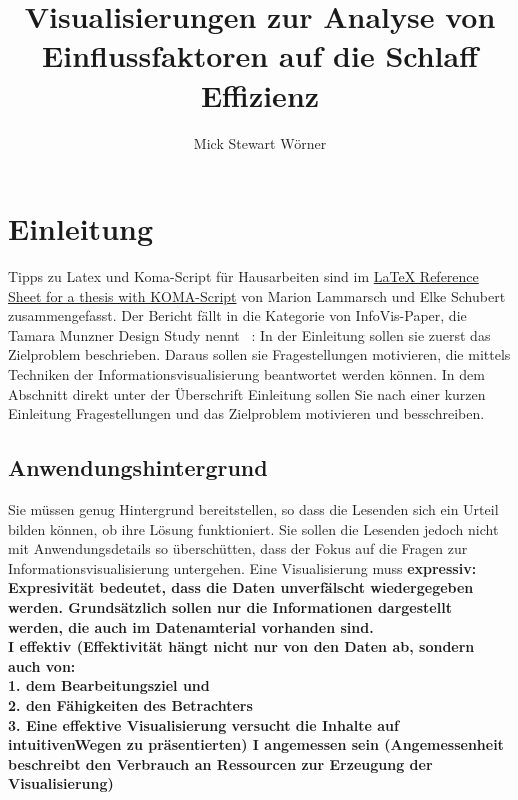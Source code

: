 \documentclass[usegeometry=true]{scrartcl}
\begin{document}
\subject{Projektbericht zum Modul Information Retrieval und Visualisierung Sommersemester 2023}
\title{Visualisierungen zur Analyse von Einflussfaktoren auf die Schlaff Effizienz}
\author{Mick Stewart Wörner}%
\maketitle%
\newpage
\section{Einleitung}
Tipps zu Latex und Koma-Script für Hausarbeiten sind im \href{http://mirrors.ctan.org/info/latex-refsheet/LaTeX_RefSheet.pdf}{LaTeX Reference Sheet for a thesis with KOMA-Script} von Marion Lammarsch und Elke Schubert zusammengefasst. 
Der Bericht fällt in die Kategorie von InfoVis-Paper, die Tamara Munzner Design Study nennt ~\cite{Munzner2008}: In der Einleitung sollen sie zuerst das Zielproblem beschrieben. Daraus sollen sie Fragestellungen motivieren, die mittels Techniken der Informationsvisualisierung beantwortet werden können. In dem Abschnitt direkt unter der Überschrift Einleitung sollen Sie nach einer kurzen Einleitung Fragestellungen und das Zielproblem motivieren und besschreiben. 

\subsection{Anwendungshintergrund}
Sie müssen genug Hintergrund bereitstellen, so dass die Lesenden sich ein Urteil bilden können, ob ihre Lösung funktioniert. 
Sie sollen die Lesenden jedoch nicht mit Anwendungsdetails so überschütten, dass der Fokus auf die Fragen zur Informationsvisualisierung untergehen. 
Eine Visualisierung muss 
\textbf{expressiv: Expresivität bedeutet, dass die Daten unverfälscht wiedergegeben werden. Grundsätzlich sollen nur die Informationen dargestellt werden, die auch im Datenamterial vorhanden sind.\\
I effektiv (Effektivität hängt nicht nur von den Daten ab, sondern auch von:\\ 1. dem Bearbeitungsziel und \\2. den Fähigkeiten des Betrachters \\
3. Eine effektive Visualisierung versucht die Inhalte auf intuitivenWegen zu präsentierten)
I angemessen sein (Angemessenheit beschreibt den Verbrauch an Ressourcen zur Erzeugung der Visualisierung)}
\end{document}
